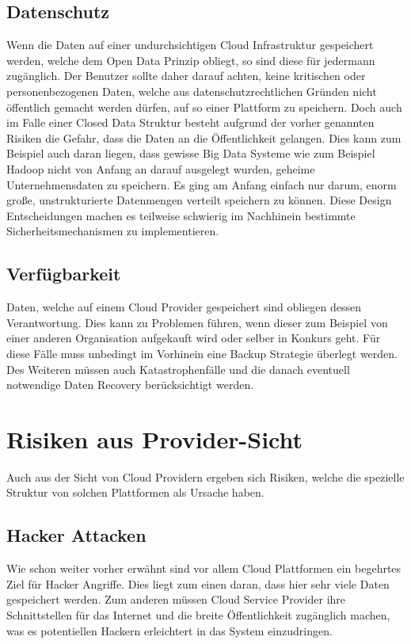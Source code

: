 \documentclass{report}
\begin{document}
\subsection{Datenschutz}
Wenn die Daten auf einer undurchsichtigen Cloud Infrastruktur gespeichert werden, welche dem Open Data Prinzip obliegt, so sind diese für jedermann zugänglich. Der Benutzer sollte daher darauf achten, keine kritischen oder personenbezogenen Daten, welche aus datenschutzrechtlichen Gründen nicht öffentlich gemacht werden dürfen, auf so einer Plattform zu speichern. Doch auch im Falle einer Closed Data Struktur besteht aufgrund der vorher genannten Risiken die Gefahr, dass die Daten an die Öffentlichkeit gelangen. Dies kann zum Beispiel auch daran liegen, dass gewisse Big Data Systeme wie zum Beispiel Hadoop nicht von Anfang an darauf ausgelegt wurden, geheime Unternehmensdaten zu speichern. Es ging am Anfang einfach nur darum, enorm große, unstrukturierte Datenmengen verteilt speichern zu können. Diese Design Entscheidungen machen es teilweise schwierig im Nachhinein bestimmte Sicherheitsmechanismen zu implementieren. \cite{haa2013}

\subsection{Verfügbarkeit}
Daten, welche auf einem Cloud Provider gespeichert sind obliegen dessen Verantwortung. Dies kann zu Problemen führen, wenn dieser zum Beispiel von einer anderen Organisation aufgekauft wird oder selber in Konkurs geht. Für diese Fälle muss unbedingt im Vorhinein eine Backup Strategie überlegt werden. Des Weiteren müssen auch Katastrophenfälle und die danach eventuell notwendige Daten Recovery berücksichtigt werden. \cite{mos2011}

\section{Risiken aus Provider-Sicht}
Auch aus der Sicht von Cloud Providern ergeben sich Risiken, welche die spezielle Struktur von solchen Plattformen als Ursache haben.

\subsection{Hacker Attacken}
Wie schon weiter vorher erwähnt sind vor allem Cloud Plattformen ein begehrtes Ziel für Hacker Angriffe. Dies liegt zum einen daran, dass hier sehr viele Daten gespeichert werden. Zum anderen müssen Cloud Service Provider ihre Schnittstellen für das Internet und die breite Öffentlichkeit zugänglich machen, was es potentiellen Hackern erleichtert in das System einzudringen. \cite{mos2011}
\end{document}
